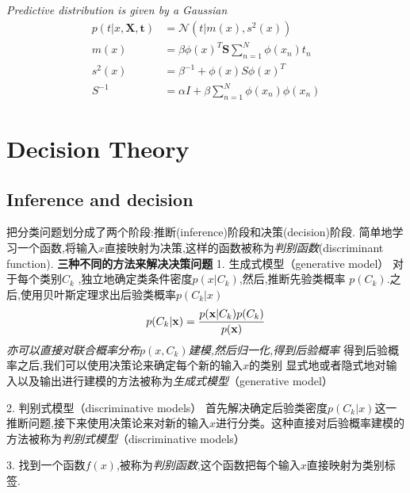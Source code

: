 \documentclass[a4paper]{article}
\begin{document}
\emph{Predictive distribution is given by a Gaussian}
\begin{align*}
  p(t|x, \mathbf{X}, \mathbf{t}) &= \mathcal{N}(t|m(x), s^2(x))\\
  m(x) &= \beta \phi(x)^T \mathbf{S} \sum_{n=1}^N \phi(x_n)t_n\\
  s^2(x) &= \beta^{-1} + \phi(x) S \phi(x)^T\\
  S^{-1} &= \alpha I + \beta  \sum_{n=1}^N \phi(x_n)\phi(x_n)
\end{align*}

\section{Decision Theory}
\label{sec:1.5}

\subsection{Inference and decision}
\label{sec:1.5.4}

把分类问题划分成了两个阶段:推断(inference)阶段和决策(decision)阶段.
简单地学习一个函数,将输入$x$直接映射为决策,这样的函数被称为\emph{判别函数}(discriminant function).
\textbf{三种不同的方法来解决决策问题}
1. 生成式模型（generative model）
对于每个类别$C_k$ ,独立地确定类条件密度$p(x| C_k)$,然后,推断先验类概率 $p(C_k)$.之后,使用贝叶斯定理求出后验类概率$p(C_k|x)$
\begin{align}
  p(C_k|\mathbf{x}) = {p(\mathbf{x}|C_k)p(C_k) \over p(\mathbf{x})}
\end{align}
\textit{亦可以直接对联合概率分布$p(x, C_k)$建模,然后归一化,得到后验概率}
得到后验概率之后,我们可以使用决策论来确定每个新的输入$x$的类别
显式地或者隐式地对输入以及输出进行建模的方法被称为\emph{生成式模型}（generative model）

2. 判别式模型（discriminative models）
首先解决确定后验类密度$p(C_k|x)$这一推断问题,接下来使用决策论来对新的输入$x$进行分类。这种直接对后验概率建模的方法被称为\emph{判别式模型}（discriminative models）

3. 找到一个函数$f(x)$,被称为\emph{判别函数},这个函数把每个输入$x$直接映射为类别标签.
\end{document}
